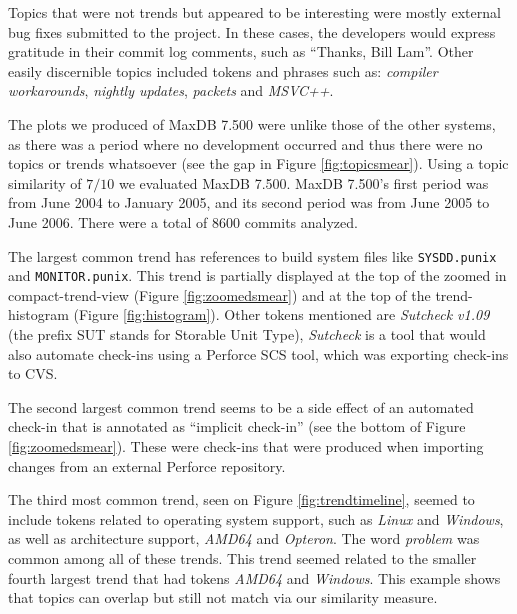 \documentclass[times, 10pt,twocolumn]{article}
\newcommand{\hla}[1]{{\color{changecolor2} #1 }}
\newcommand{\shrinkit}{\vspace*{-.3em}}
\begin{document}
Topics that were not trends but appeared to be interesting were mostly
external bug fixes submitted to the project.  In these cases, the
developers would express gratitude in their commit log comments, such
as ``Thanks, Bill Lam''.  Other easily discernible topics included
tokens and phrases such as: \emph{compiler workarounds}, \emph{nightly
  updates}, \emph{packets} and \emph{MSVC++}.


\shrinkit
{}
\shrinkit






The plots we produced of MaxDB 7.500 were unlike those of the other
\hla{
systems, as there was a period where no development occurred and thus
there were no topics or trends whatsoever (see the gap in Figure
\ref{fig:topicsmear}). Using a topic similarity of $7/10$ we evaluated
MaxDB 7.500. MaxDB 7.500's first period was from June 2004 to January
2005, and its second period was from June 2005 to June 2006. There
were a total of $8 600$ commits analyzed.
}

The largest common trend has references to build system files like
\texttt{SYSDD.punix} and \texttt{MONITOR.punix}.  This trend is
partially displayed at the top of the zoomed in compact-trend-view
(Figure \ref{fig:zoomedsmear}) and at the top of the trend-histogram
(Figure \ref{fig:histogram}).  Other tokens mentioned are
\emph{Sutcheck v1.09} (the prefix SUT stands for Storable Unit Type),
\emph{Sutcheck} is a tool that would also automate check-ins using a Perforce SCS
tool, which was exporting check-ins to CVS.

The second largest common trend seems to be a side effect of an
automated check-in that is annotated as ``implicit check-in'' (see
the bottom of Figure \ref{fig:zoomedsmear}). These were check-ins that
were produced when importing changes from an external Perforce
repository.

The third most common trend, seen on Figure \ref{fig:trendtimeline},
seemed to include tokens related to operating system support, such as
\emph{Linux} and \emph{Windows}, as well as architecture support, \emph{AMD64} and
\emph{Opteron}. The word \emph{problem} was common among all of these
trends. This trend seemed related to the smaller fourth largest trend
that had tokens \emph{AMD64} and \emph{Windows}. This example shows that
topics can overlap but still not match via our similarity measure.
\end{document}
